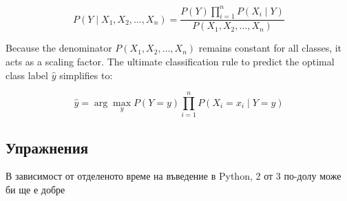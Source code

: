 		\begin{equation}
		P(Y \mid X_1, X_2, \dots, X_n) = \frac{P(Y) \prod_{i=1}^{n} P(X_i \mid Y)}{P(X_1, X_2, \dots, X_n)}
		\end{equation}
		
		Because the denominator $P(X_1, X_2, \dots, X_n)$ remains constant for all classes, it acts as a scaling factor. The ultimate classification rule to predict the optimal class label $\hat{y}$ simplifies to:
		
		\begin{equation}
		\hat{y} = \arg\max_{y} P(Y = y) \prod_{i=1}^{n} P(X_i = x_i \mid Y = y)
		\end{equation}
		
	
	
	
	\subsection{Упражнения}
	В зависимост от отделеното време на въведение в Python,
	2 от 3 по-долу може би ще е добре
	
